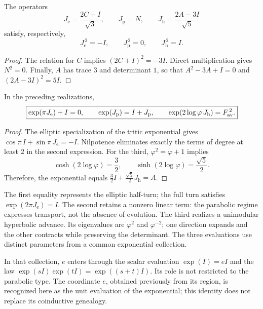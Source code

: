 \begin{proposition}
\label{euler-trit-generadores}
The operators
\[
 J_{\mathrm e}=\frac{2C+I}{\sqrt3},\qquad
 J_{\mathrm p}=N,\qquad
 J_{\mathrm h}=\frac{2A-3I}{\sqrt5}
\]
satisfy, respectively,
\[
 J_{\mathrm e}^{\,2}=-I,\qquad
 J_{\mathrm p}^{\,2}=0,\qquad
 J_{\mathrm h}^{\,2}=I.
\]
\end{proposition}
\begin{proof}
The relation for \(C\) implies \((2C+I)^2=-3I\).
Direct multiplication gives \(N^2=0\).
Finally, \(A\) has trace \(3\) and determinant \(1\), so that
\(A^2-3A+I=0\) and \((2A-3I)^2=5I\).
\end{proof}

\begin{proposition}
\label{euler-trit-evaluaciones}
In the preceding realizations,
\begin{equation}
 \boxed{
 \exp(\pi J_{\mathrm e})+I=0,\qquad
 \exp(J_{\mathrm p})=I+J_{\mathrm p},\qquad
 \exp(2\log\varphi\,J_{\mathrm h})=F_{\rm av}^{\,2}.}
 \label{euler-trit-tres-evaluaciones}
\end{equation}
\end{proposition}
\begin{proof}
The elliptic specialization of the tritic exponential gives
\(\cos\pi\,I+\sin\pi\,J_{\mathrm e}=-I\).
Nilpotence eliminates exactly the terms of degree at least \(2\)
in the second expression. For the third, \(\varphi^2=\varphi+1\) implies
\[
 \cosh(2\log\varphi)=\frac32,\qquad
 \sinh(2\log\varphi)=\frac{\sqrt5}{2}.
\]
Therefore, the exponential equals
\(\frac32I+\frac{\sqrt5}{2}J_{\mathrm h}=A\).
\end{proof}

The first equality represents the elliptic half-turn; the full turn
satisfies \(\exp(2\pi J_{\mathrm e})=I\). The second retains a nonzero
linear term: the parabolic regime expresses transport, not the absence of
evolution. The third realizes a unimodular hyperbolic advance. Its
eigenvalues are \(\varphi^2\) and \(\varphi^{-2}\); one direction expands and
the other contracts while preserving the determinant. The three evaluations
use distinct parameters from a common exponential collection.

In that collection, \(e\) enters through the scalar evaluation
\(\exp(I)=eI\) and the law \(\exp(sI)\exp(tI)=\exp((s+t)I)\).
Its role is not restricted to the parabolic type. The coordinate \(e\), obtained
previously from its region, is recognized here as the unit evaluation
of the exponential; this identity does not replace its coinductive genealogy.


